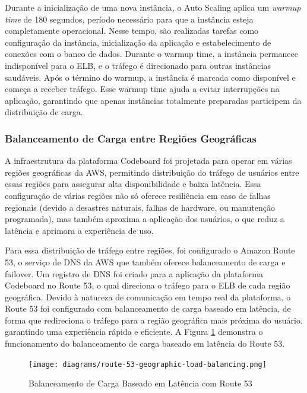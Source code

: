 Durante a inicialização de uma nova instância, o Auto Scaling aplica um \emph{warmup time} de 180 segundos, período necessário para que a instância esteja completamente operacional. Nesse tempo, são realizadas tarefas como configuração da instância, inicialização da aplicação e estabelecimento de conexões com o banco de dados. Durante o warmup time, a instância permanece indisponível para o ELB, e o tráfego é direcionado para outras instâncias saudáveis. Após o término do warmup, a instância é marcada como disponível e começa a receber tráfego. Esse warmup time ajuda a evitar interrupções na aplicação, garantindo que apenas instâncias totalmente preparadas participem da distribuição de carga.


\subsubsection{Balanceamento de Carga entre Regiões Geográficas}

A infraestrutura da plataforma Codeboard foi projetada para operar em várias regiões geográficas da AWS, permitindo distribuição do tráfego de usuários entre essas regiões para assegurar alta disponibilidade e baixa latência. Essa configuração de várias regiões não só oferece resiliência em caso de falhas regionais (devido a desastres naturais, falhas de hardware, ou manutenção programada), mas também aproxima a aplicação dos usuários, o que reduz a latência e aprimora a experiência de uso.

Para essa distribuição de tráfego entre regiões, foi configurado o Amazon Route 53, o serviço de DNS da AWS que também oferece balanceamento de carga e failover. Um registro de DNS foi criado para a aplicação da plataforma Codeboard no Route 53, o qual direciona o tráfego para o ELB de cada região geográfica. Devido à natureza de comunicação em tempo real da plataforma, o Route 53 foi configurado com balanceamento de carga baseado em latência, de forma que redireciona o tráfego para a região geográfica mais próxima do usuário, garantindo uma experiência rápida e eficiente. A Figura \ref{fig:route-53-geographic-load-balancing} demonstra o funcionamento do balanceamento de carga baseado em latência do Route 53.

\begin{figure}[H]
    \centering
    \texttt{[image: diagrams/route-53-geographic-load-balancing.png]}
    \caption{Balanceamento de Carga Baseado em Latência com Route 53}
    \label{fig:route-53-geographic-load-balancing}
\end{figure}

